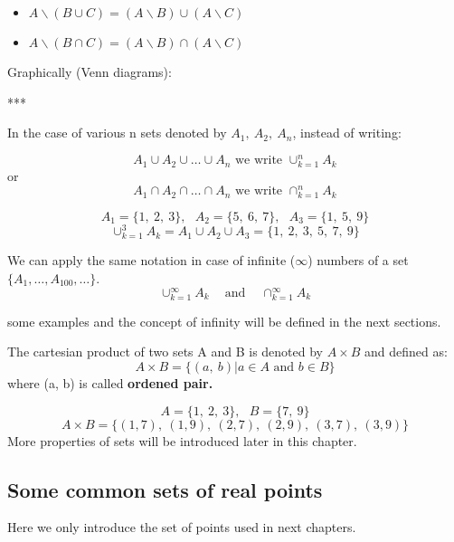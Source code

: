 \documentclass[12pt, a4paper]{book}
\begin{document}
\begin{itemize}
  \item $A \backslash (B \cup C) = (A \backslash B) \cup (A \backslash C)$
  \item $A \backslash (B \cap C) = (A \backslash B) \cap (A \backslash C)$
\end{itemize}

Graphically (Venn diagrams):

***

\begin{note}
  In the case of various n sets denoted by $A_1, \ A_2, \ A_n$, instead of writing:

  \[
    A_1 \cup A_2 \cup \ldots \cup A_n \text{ we write } \cup_{k=1}^{n} A_k
  \]
  or
  \[
    A_1 \cap A_2 \cap \ldots \cap A_n \text{ we write } \cap_{k=1}^{n} A_k
  \]
\end{note}

\begin{exmp}
  \[
    A_1=\{1, \ 2, \ 3 \}, \ \ \ A_2=\{ 5,\ 6, \ 7 \}, \ \ \ A_3= \{1, \ 5, \ 9 \}
  \]
  \[
    \cup_{k=1}^{3} A_k=A_1 \cup A_2 \cup A_3 = \{ 1, \ 2, \ 3, \ 5, \ 7, \ 9 \}
  \]
\end{exmp}

\begin{rem}
We can apply the same notation in case of infinite ($\infty$) numbers of a set $\{ A_1, \ldots, A_{100}, \ldots \}$.
\[
  \displaystyle\cup_{k=1}^{\infty}A_k \ \ \ \ \text{ and } \ \ \ \ \displaystyle\cap_{k=1}^{\infty}A_k
\]
\end{rem}
some examples and the concept of infinity will be defined in the next sections.

\begin{defn}
  The cartesian product of two sets A and B is denoted by \boldmath $A \times B$  and defined as:
  \[
    A \times B = \{ (a, \ b  ) | a \in A \text{ and } b \in B \}
  \]
  \unboldmath
  where (a, b) is called \textbf{ordened pair.} 
\end{defn}

\begin{exmp}
  \[
    A=\{1, \ 2, \ 3 \}, \ \ \ B=\{7, \ 9 \}
  \]
  \[
    A \times B= \{ (1,7), \ (1,9), \ (2,7), \ (2,9), \ (3,7), \ (3,9) \}
  \]
  More properties of sets will be introduced later in this chapter.
\end{exmp}

\subsection*{Some common sets of real points}
Here we only introduce the set of points used in next chapters.
\end{document}
